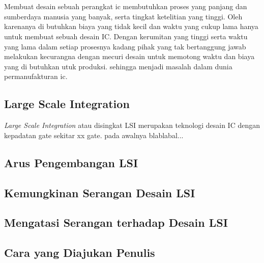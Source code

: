 \chapter{\babDua}
Membuat desain sebuah perangkat ic membutuhkan proses yang panjang dan sumberdaya manusia yang banyak, serta tingkat ketelitian yang tinggi. Oleh karenanya di butuhkan biaya yang tidak kecil dan waktu yang cukup lama hanya untuk membuat sebuah desain IC. Dengan kerumitan yang tinggi serta waktu yang lama dalam setiap prosesnya kadang pihak yang tak bertanggung jawab melakukan kecurangna dengan mecuri desain untuk memotong waktu dan biaya yang di butuhkan utuk produksi. sehingga menjadi masalah dalam dunia permanufakturan ic.

\section{Large Scale Integration}
\textit{Large Scale Integration} atau disingkat LSI merupakan teknologi desain IC dengan kepadatan gate sekitar xx gate. pada awalnya blablabal...

\section{Arus Pengembangan LSI}

\section{Kemungkinan Serangan Desain LSI}

\section{Mengatasi Serangan terhadap Desain LSI}

\section{Cara yang Diajukan Penulis}

